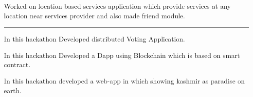 \documentclass[localFont,alternative,10pt,compact]{main}
\begin{document}
\begin{minipage}[t]{0.66\textwidth}
         
        \noindent
        \hspace{5em}%
        \begin{minipage}{0.85\textwidth\vspace{2pt}}
            Worked on location based services application which provide services at any location near
            services provider and also made friend module.
        \end{minipage}

        \noindent\rule{12.5cm}{0.4pt}
         
        \noindent
        \hspace{5em}%
        \begin{minipage}{0.85\textwidth\vspace{2pt}}
            In this hackathon Developed distributed Voting Application.
        \end{minipage}
         
        \noindent
        \hspace{5em}%
        \begin{minipage}{0.85\textwidth\vspace{2pt}}
            In this hackathon Developed a Dapp using Blockchain which is based on smart contract.
        \end{minipage}
         
        \noindent
        \hspace{5em}%
        \begin{minipage}{0.85\textwidth\vspace{2pt}}
            In this hackathon developed a web-app in which showing kashmir as paradise on earth.
        \end{minipage}


\end{minipage}
\end{document}
